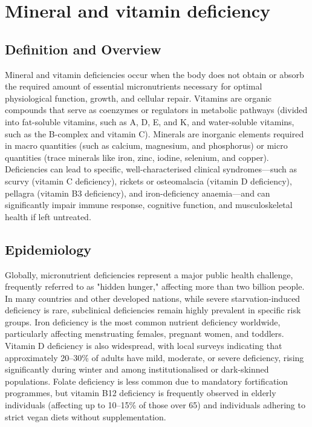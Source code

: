 \chapter{Mineral and vitamin deficiency}

\section*{Definition and Overview}
Mineral and vitamin deficiencies occur when the body does not obtain or absorb the required amount of essential micronutrients necessary for optimal physiological function, growth, and cellular repair. Vitamins are organic compounds that serve as coenzymes or regulators in metabolic pathways (divided into fat-soluble vitamins, such as A, D, E, and K, and water-soluble vitamins, such as the B-complex and vitamin C). Minerals are inorganic elements required in macro quantities (such as calcium, magnesium, and phosphorus) or micro quantities (trace minerals like iron, zinc, iodine, selenium, and copper). Deficiencies can lead to specific, well-characterised clinical syndromes—such as scurvy (vitamin C deficiency), rickets or osteomalacia (vitamin D deficiency), pellagra (vitamin B3 deficiency), and iron-deficiency anaemia—and can significantly impair immune response, cognitive function, and musculoskeletal health if left untreated.

\section*{Epidemiology}
Globally, micronutrient deficiencies represent a major public health challenge, frequently referred to as "hidden hunger," affecting more than two billion people. In many countries and other developed nations, while severe starvation-induced deficiency is rare, subclinical deficiencies remain highly prevalent in specific risk groups. Iron deficiency is the most common nutrient deficiency worldwide, particularly affecting menstruating females, pregnant women, and toddlers. Vitamin D deficiency is also widespread, with local surveys indicating that approximately 20--30\% of adults have mild, moderate, or severe deficiency, rising significantly during winter and among institutionalised or dark-skinned populations. Folate deficiency is less common due to mandatory fortification programmes, but vitamin B12 deficiency is frequently observed in elderly individuals (affecting up to 10--15\% of those over 65) and individuals adhering to strict vegan diets without supplementation.

